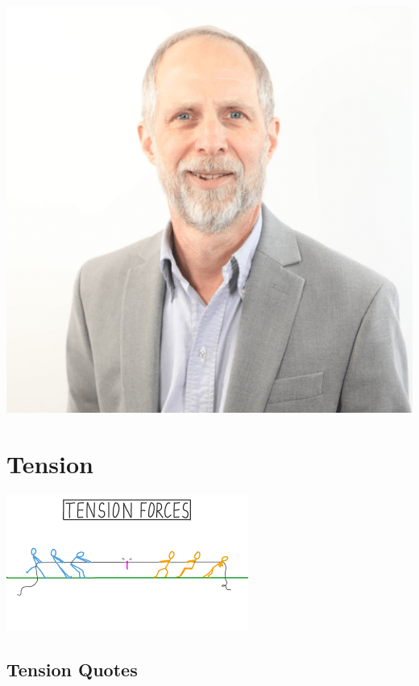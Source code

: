 \documentclass[
]{book}
\begin{document}
\begin{center}\includegraphics[width=1\linewidth]{_images/JodyLipford} \end{center}

\hypertarget{tension}{%
\chapter{Tension}\label{tension}}

\begin{center}\includegraphics[width=1\linewidth]{_images/tension} \end{center}

\hypertarget{tension-quotes}{%
\section{Tension Quotes}\label{tension-quotes}}
\end{document}
